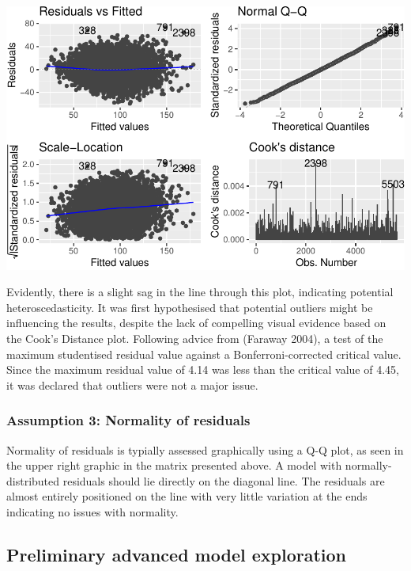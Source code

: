 \documentclass{article}
\begin{document}
\includegraphics{OLET5608_TrentHenderson_files/figure-latex/unnamed-chunk-5-1.pdf}

Evidently, there is a slight sag in the line through this plot,
indicating potential heteroscedasticity. It was first hypothesised that
potential outliers might be influencing the results, despite the lack of
compelling visual evidence based on the Cook's Distance plot. Following
advice from (Faraway 2004), a test of the maximum studentised residual
value against a Bonferroni-corrected critical value. Since the maximum
residual value of 4.14 was less than the critical value of 4.45, it was
declared that outliers were not a major issue.

\hypertarget{assumption-3-normality-of-residuals}{%
\subsubsection{Assumption 3: Normality of
residuals}\label{assumption-3-normality-of-residuals}}

Normality of residuals is typially assessed graphically using a Q-Q
plot, as seen in the upper right graphic in the matrix presented above.
A model with normally-distributed residuals should lie directly on the
diagonal line. The residuals are almost entirely positioned on the line
with very little variation at the ends indicating no issues with
normality.

\hypertarget{preliminary-advanced-model-exploration}{%
\subsection{Preliminary advanced model
exploration}\label{preliminary-advanced-model-exploration}}
\end{document}
